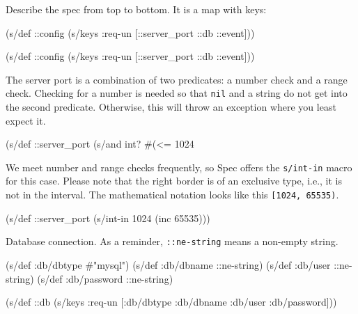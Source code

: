 \noindent
Describe the spec from top to bottom. It is a map with keys:

\ifx\DEVICETYPE\MOBILE

\begin{english}
  \begin{clojure}
(s/def ::config
  (s/keys :req-un [::server_port
                   ::db ::event]))
  \end{clojure}
\end{english}

\else

\begin{english}
  \begin{clojure}
(s/def ::config
  (s/keys :req-un [::server_port ::db ::event]))
  \end{clojure}
\end{english}

\fi


The server port is a combination of two predicates: a number check and a range check. Checking for a number is needed so that \verb|nil| and a string do not get into the second predicate. Otherwise, this will throw an exception where you least expect it.

\begin{english}
  \begin{clojure}
(s/def ::server_port
  (s/and int? #(<= 1024 %
  \end{clojure}
\end{english}


We meet number and range checks frequently, so Spec offers the \verb|s/int-in| macro for this case. Please note that the right border is of an exclusive type, i.e., it is not in the interval. The mathematical notation looks like this \verb|[1024, 65535)|.

\begin{english}
  \begin{clojure}
(s/def ::server_port
  (s/int-in 1024 (inc 65535)))
  \end{clojure}
\end{english}


\noindent
Database connection. As a reminder, \verb|::ne-string| means a non-empty string.

\begin{english}
  \begin{clojure}
(s/def :db/dbtype   #{"mysql"})
(s/def :db/dbname   ::ne-string)
(s/def :db/user     ::ne-string)
(s/def :db/password ::ne-string)

(s/def ::db
  (s/keys :req-un [:db/dbtype
                   :db/dbname
                   :db/user
                   :db/password]))
  \end{clojure}
\end{english}

